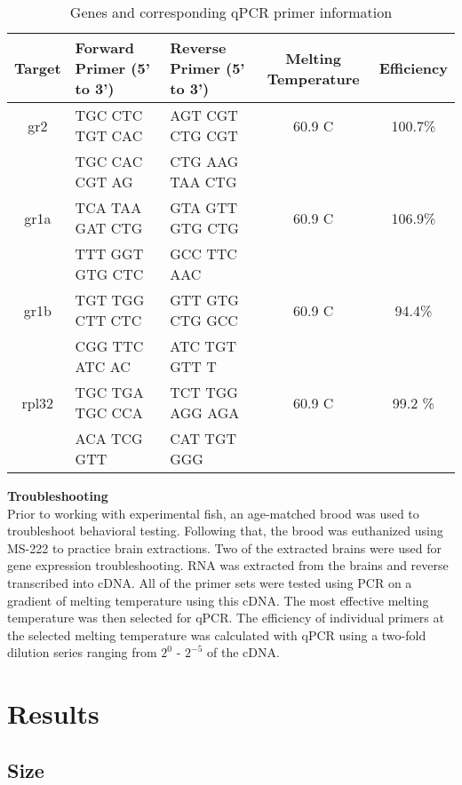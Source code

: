 \documentclass[12pt,twoside]{reedthesis}
\begin{document}
\begin{table}[htbp]
\caption[Genes and corresponding qPCR primer information]{Genes and corresponding
 qPCR primer information}
\begin{center}
\footnotesize
\begin{tabular}{ | c | l | l | c | c |}
\hline
Target & Forward Primer (5' to 3')& Reverse Primer (5' to 3') & Melting Temperature & Efficiency\\
\hline
gr2 & TGC CTC TGT CAC & AGT CGT CTG CGT & 60.9 \textdegree{}C& 100.7\%\\
  &  TGC CAC CGT AG & CTG AAG TAA CTG & & \\
\hline
  gr1a & TCA TAA GAT CTG& GTA GTT GTG CTG & 60.9 \textdegree{}C& 106.9\% \\
  &  TTT GGT GTG CTC &  GCC TTC AAC & & \\
\hline
    gr1b & TGT TGG CTT CTC  & GTT GTG CTG GCC & 60.9 \textdegree{}C& 94.4\%\\
  & CGG TTC ATC AC & ATC TGT GTT T & & \\
\hline
    rpl32 & TGC TGA TGC CCA & TCT TGG AGG AGA & 60.9 \textdegree{}C& 99.2 \%\\
  & ACA TCG GTT & CAT TGT GGG & & \\
\hline
\end{tabular}
\end{center}
\end{table}

\noindent\textbf{Troubleshooting}\\
Prior to working with experimental fish, an age-matched brood was used to
troubleshoot behavioral testing. Following that, the brood was euthanized using
MS-222 to practice brain extractions. Two of the extracted brains were used for
gene expression troubleshooting. RNA was extracted from the brains and reverse
transcribed into cDNA. All of the primer sets were tested using PCR on a gradient of
melting temperature using this cDNA. The most effective melting temperature was
then selected for qPCR. The efficiency of individual primers at the selected
melting temperature was calculated with qPCR using a two-fold dilution series
ranging from $2^0$ - $2^{-5}$ of the cDNA.

\chapter{Results}
\section{Size}
\end{document}
